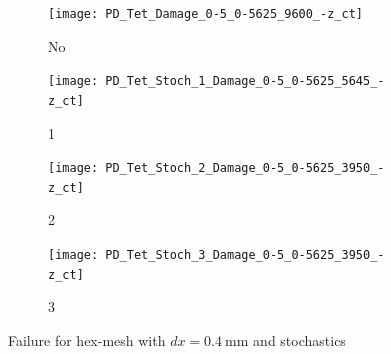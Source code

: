 \begin{figure}[htbp]
  \hfill
  \begin{subfigure}{0.10\linewidth}
    \begin{minipage}[b][\figheight]{\linewidth}
    \centering
      \texttt{[image: PD\_Tet\_Damage\_0-5\_0-5625\_9600\_-z\_ct]}
    \end{minipage}
    \caption{No}
  \end{subfigure}
  \hfill
  \begin{subfigure}{0.10\linewidth}
    \begin{minipage}[b][\figheight]{\linewidth}
      \centering
      \texttt{[image: PD\_Tet\_Stoch\_1\_Damage\_0-5\_0-5625\_5645\_-z\_ct]}
    \end{minipage}
    \caption{1}
  \end{subfigure}
  \hfill
  \begin{subfigure}{0.10\linewidth}
    \begin{minipage}[b][\figheight]{\linewidth}
      \centering
      \texttt{[image: PD\_Tet\_Stoch\_2\_Damage\_0-5\_0-5625\_3950\_-z\_ct]}
    \end{minipage}
    \caption{2}
  \end{subfigure}
  \begin{subfigure}{0.10\linewidth}
    \begin{minipage}[b][\figheight]{\linewidth}
      \centering
      \texttt{[image: PD\_Tet\_Stoch\_3\_Damage\_0-5\_0-5625\_3950\_-z\_ct]}
    \end{minipage}
    \caption{3}
  \end{subfigure}
  \caption{Failure for hex-mesh with $dx=\SI{0.4}{\milli\meter}$ and stochastics}
  \label{fig:Results:Tet:Stoch}
\end{figure}
